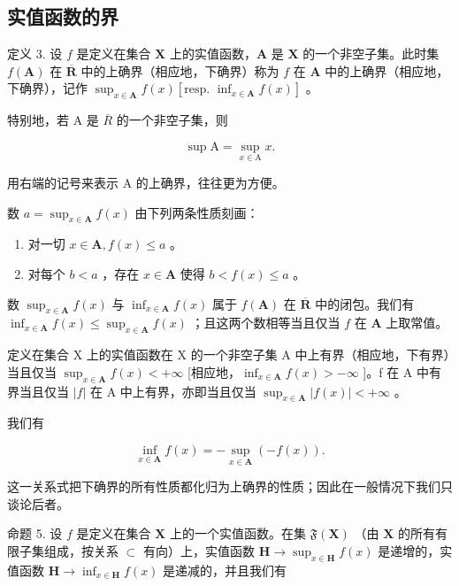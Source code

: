 \subsection{实值函数的界}

定义 3. 设 \(f\) 是定义在集合 \(\mathbf{X}\) 上的实值函数，\(\mathbf{A}\) 是 \(\mathbf{X}\) 的一个非空子集。此时集 \(f(\mathbf{A})\) 在 \(\overline{\mathbf{R}}\) 中的上确界（相应地，下确界）称为 \(f\) 在 \(\mathbf{A}\) 中的上确界（相应地，下确界），记作 \(\sup_{x\in \mathbf{A}}f(x)\left[\text{resp. } \inf_{x\in \mathbf{A}} f(x)\right]\) 。

特别地，若 A 是 \(\overline{R}\) 的一个非空子集，则

\[
\sup \mathrm{A} = \sup _ {x \in \mathrm{A}} x.\tag{1}
\]

用右端的记号来表示 A 的上确界，往往更为方便。

数 \(a = \sup_{x \in \mathbf{A}} f(x)\) 由下列两条性质刻画：

\begin{enumerate}
\def\labelenumi{(\roman{enumi})}
\item
  对一切 \(x \in \mathbf{A}, f(x) \leqslant a\) 。
\item
  对每个 \(b < a\) ，存在 \(x \in \mathbf{A}\) 使得 \(b < f(x) \leqslant a\) 。
\end{enumerate}

数 \(\sup_{x\in\mathbf{A}}f(x)\) 与 \(\inf_{x\in\mathbf{A}}f(x)\) 属于 \(f(\mathbf{A})\) 在 \(\overline{\mathbf{R}}\) 中的闭包。我们有 \(\inf_{x\in\mathbf{A}}f(x)\leqslant\sup_{x\in\mathbf{A}}f(x)\) ；且这两个数相等当且仅当 \(f\) 在 \(\mathbf{A}\) 上取常值。

定义在集合 X 上的实值函数在 X 的一个非空子集 A 中上有界（相应地，下有界）当且仅当 \(\sup_{x\in\mathbf{A}}f(x)<+\infty\) {[}相应地，\(\inf_{x\in\mathbf{A}}f(x)>-\infty\) {]}。f 在 A 中有界当且仅当 \(|f|\) 在 A 中上有界，亦即当且仅当 \(\sup_{x\in\mathbf{A}}|f(x)|<+\infty\) 。

我们有

\[
\inf _ {x \in \mathbf {A}} f (x) = - \sup _ {x \in \mathbf {A}} (- f (x)).\tag{2}
\]

这一关系式把下确界的所有性质都化归为上确界的性质；因此在一般情况下我们只谈论后者。

命题 5. 设 \(f\) 是定义在集合 \(\mathbf{X}\) 上的一个实值函数。在集 \(\mathfrak{F}(\mathbf{X})\) （由 \(\mathbf{X}\) 的所有有限子集组成，按关系 \(\subset\) 有向）上，实值函数 \(\mathbf{H} \to \sup_{x \in \mathbf{H}} f(x)\) 是递增的，实值函数 \(\mathbf{H} \to \inf_{x \in \mathbf{H}} f(x)\) 是递减的，并且我们有

